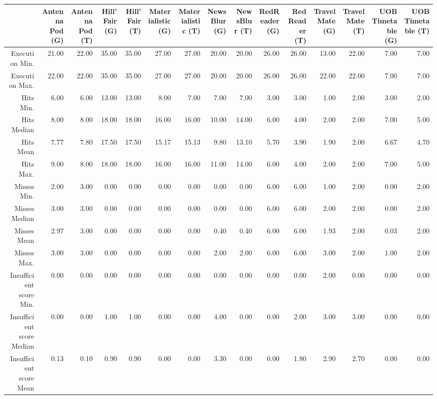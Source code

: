 \begin{table}[ht]
\centering
\begin{tabular}{rrrrrrrrrrrrrrr}
  \hline
 & Antenna Pod (G) & Antenna Pod (T) & Hill'Fair (G) & Hill'Fair (T) & Materialistic (G) & Materialistic (T) & NewsBlur (G) & NewsBlur (T) & RedReader (G) & RedReader (T) & Travel Mate (G) & Travel Mate (T) & UOB Timetable (G) & UOB Timetable (T) \\ 
  \hline
Execution Min. & 21.00 & 22.00 & 35.00 & 35.00 & 27.00 & 27.00 & 20.00 & 20.00 & 26.00 & 26.00 & 13.00 & 22.00 & 7.00 & 7.00 \\ 
  Execution Max. & 22.00 & 22.00 & 35.00 & 35.00 & 27.00 & 27.00 & 20.00 & 20.00 & 26.00 & 26.00 & 22.00 & 22.00 & 7.00 & 7.00 \\ 
  Hits Min. & 6.00 & 6.00 & 13.00 & 13.00 & 8.00 & 7.00 & 7.00 & 7.00 & 3.00 & 3.00 & 1.00 & 2.00 & 3.00 & 2.00 \\ 
  Hits Median & 8.00 & 8.00 & 18.00 & 18.00 & 16.00 & 16.00 & 10.00 & 14.00 & 6.00 & 4.00 & 2.00 & 2.00 & 7.00 & 5.00 \\ 
  Hits Mean & 7.77 & 7.80 & 17.50 & 17.50 & 15.17 & 15.13 & 9.80 & 13.10 & 5.70 & 3.90 & 1.90 & 2.00 & 6.67 & 4.70 \\ 
  Hits Max. & 9.00 & 8.00 & 18.00 & 18.00 & 16.00 & 16.00 & 11.00 & 14.00 & 6.00 & 4.00 & 2.00 & 2.00 & 7.00 & 5.00 \\ 
  Misses Min. & 2.00 & 3.00 & 0.00 & 0.00 & 0.00 & 0.00 & 0.00 & 0.00 & 6.00 & 6.00 & 1.00 & 2.00 & 0.00 & 2.00 \\ 
  Misses Median & 3.00 & 3.00 & 0.00 & 0.00 & 0.00 & 0.00 & 0.00 & 0.00 & 6.00 & 6.00 & 2.00 & 2.00 & 0.00 & 2.00 \\ 
  Misses Mean & 2.97 & 3.00 & 0.00 & 0.00 & 0.00 & 0.00 & 0.40 & 0.40 & 6.00 & 6.00 & 1.93 & 2.00 & 0.03 & 2.00 \\ 
  Misses Max. & 3.00 & 3.00 & 0.00 & 0.00 & 0.00 & 0.00 & 2.00 & 2.00 & 6.00 & 6.00 & 3.00 & 2.00 & 1.00 & 2.00 \\ 
  Insufficient score Min. & 0.00 & 0.00 & 0.00 & 0.00 & 0.00 & 0.00 & 0.00 & 0.00 & 0.00 & 0.00 & 2.00 & 0.00 & 0.00 & 0.00 \\ 
  Insufficient score Median & 0.00 & 0.00 & 1.00 & 1.00 & 0.00 & 0.00 & 4.00 & 0.00 & 0.00 & 2.00 & 3.00 & 3.00 & 0.00 & 0.00 \\ 
  Insufficient score Mean & 0.13 & 0.10 & 0.90 & 0.90 & 0.00 & 0.00 & 3.30 & 0.00 & 0.00 & 1.80 & 2.90 & 2.70 & 0.00 & 0.00 \\ 

\end{tabular}
\end{table}
